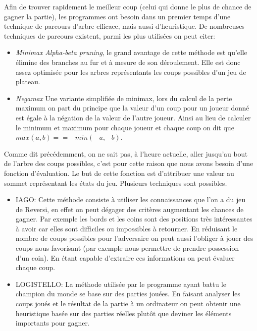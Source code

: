 \documentclass[12pt]{article}
\begin{document}
Afin de trouver rapidement le meilleur coup (celui qui donne le plus de chance de gagner la partie), les programmes ont besoin dans un premier temps d'une technique de parcours d'arbre efficace, mais aussi d'heuristique. De nombreuses techniques de parcours existent, parmi les plus utilisées on peut citer:
\begin{itemize}
\item \textit{Minimax Alpha-beta pruning}\cite{alpha-beta}, le grand avantage de cette méthode est qu'elle élimine des branches au fur et à mesure de son déroulement. Elle est donc assez optimisée pour les arbres représentants les coups possibles d'un jeu de plateau.
\item \textit{Negamax} Une variante simplifiée de minimax, lors du calcul de la perte maximum on part du principe que la valeur d'un coup pour un joueur donné est égale à la négation de la valeur de l'autre joueur. Ainsi au lieu de calculer le minimum et maximum pour chaque joueur et chaque coup on dit que \begin{math}
max(a, b) == -min(-a, -b).
\end{math}
\end{itemize}

Comme dit précédemment, on ne sait pas, à l'heure actuelle, aller jusqu'au bout de l'arbre des coups possibles, c'est pour cette raison que nous avons besoin d'une fonction d'évaluation. Le but de cette fonction est d'attribuer une valeur au sommet représentant les états du jeu. Plusieurs techniques sont possibles\cite{heuristique}.
\begin{itemize}
\item IAGO: Cette méthode consiste à utiliser les connaissances que l'on a du jeu de Reversi\cite{strategie}, en effet on peut dégager des critères augmentant les chances de gagner. Par exemple les bords et les coins sont des positions très intéressantes à avoir car elles sont difficiles ou impossibles à retourner. En réduisant le nombre de coups possibles pour l'adversaire on peut aussi l'obliger à jouer des coups nous favorisant (par exemple nous permettre de prendre possession d'un coin). En étant capable d'extraire ces informations on peut évaluer chaque coup.
\item LOGISTELLO: La méthode utilisée par le programme ayant battu le champion du monde se base sur des parties jouées. En faisant analyser les coups joués et le résultat de la partie à un ordinateur on peut obtenir une heuristique basée sur des parties réelles plutôt que deviner les éléments importants pour gagner.
\end{itemize}
\end{document}
